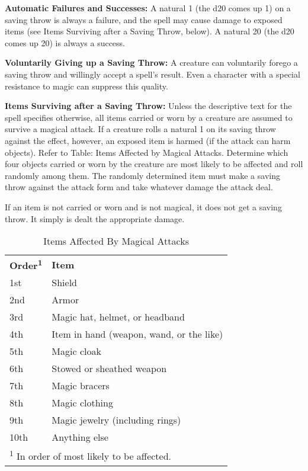 \textbf{Automatic Failures and Successes:} A natural 1 (the d20 comes up 1) on 
a saving throw is always a failure, and the spell may cause damage to exposed items 
(see Items Surviving after a Saving Throw, below). A natural 20 (the d20 comes 
up 20) is always a success.

\textbf{Voluntarily Giving up a Saving Throw:} A creature can voluntarily forego 
a saving throw and willingly accept a spell's result. Even a character with a special 
resistance to magic can suppress this quality.

\textbf{Items Surviving after a Saving Throw:} Unless the descriptive text for 
the spell specifies otherwise, all items carried or worn by a creature are assumed 
to survive a magical attack. If a creature rolls a natural 1 on its saving throw 
against the effect, however, an exposed item is harmed (if the attack can harm 
objects). Refer to Table: Items Affected by Magical Attacks. Determine which four 
objects carried or worn by the creature are most likely to be affected and roll 
randomly among them. The randomly determined item must make a saving throw against 
the attack form and take whatever damage the attack deal.

If an item is not carried or worn and is not magical, it does not get a saving 
throw. It simply is dealt the appropriate damage.

\begin{table}[htb]
\caption{Items Affected By Magical Attacks}
\centering
\begin{tabular}{l l}
\textbf{Order\textsuperscript{1}} & \textbf{Item}\\
1st & Shield\\
2nd & Armor\\
3rd & Magic hat, helmet, or headband\\
4th & Item in hand (weapon, wand, or the like)\\
5th & Magic cloak\\
6th & Stowed or sheathed weapon\\
7th & Magic bracers\\
8th & Magic clothing\\
9th & Magic jewelry (including rings)\\
10th & Anything else\\
\multicolumn{2}{l}{\textsuperscript{1} In order of most likely to be affected.}\\
\end{tabular}
\end{table}

